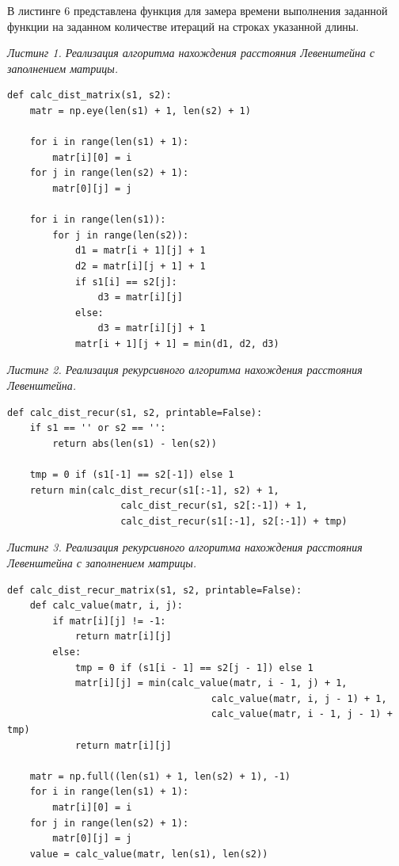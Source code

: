 \documentclass[a4paper,12pt]{article}
\begin{document}
В листинге 6 представлена функция для замера времени выполнения заданной функции на заданном количестве итераций на строках указанной длины.

\vspace{\baselineskip}

\noindent \textit{Листинг 1. Реализация алгоритма нахождения расстояния Левенштейна с заполнением матрицы.}

\begin{lstlisting}
def calc_dist_matrix(s1, s2):
	matr = np.eye(len(s1) + 1, len(s2) + 1)

	for i in range(len(s1) + 1):
		matr[i][0] = i
	for j in range(len(s2) + 1):
		matr[0][j] = j
	
	for i in range(len(s1)):
		for j in range(len(s2)):
			d1 = matr[i + 1][j] + 1
			d2 = matr[i][j + 1] + 1
			if s1[i] == s2[j]:
				d3 = matr[i][j]
			else:
				d3 = matr[i][j] + 1
			matr[i + 1][j + 1] = min(d1, d2, d3)
\end{lstlisting}

\noindent \textit{Листинг 2. Реализация рекурсивного алгоритма нахождения расстояния Левенштейна.}

\begin{lstlisting}
def calc_dist_recur(s1, s2, printable=False):
	if s1 == '' or s2 == '':
		return abs(len(s1) - len(s2))
	
	tmp = 0 if (s1[-1] == s2[-1]) else 1
	return min(calc_dist_recur(s1[:-1], s2) + 1,
					calc_dist_recur(s1, s2[:-1]) + 1,
					calc_dist_recur(s1[:-1], s2[:-1]) + tmp)
\end{lstlisting}

\clearpage

\noindent \textit{Листинг 3. Реализация рекурсивного алгоритма нахождения расстояния Левенштейна с заполнением матрицы.}

\begin{lstlisting}
def calc_dist_recur_matrix(s1, s2, printable=False):
	def calc_value(matr, i, j):
		if matr[i][j] != -1:
			return matr[i][j]
		else:
			tmp = 0 if (s1[i - 1] == s2[j - 1]) else 1
			matr[i][j] = min(calc_value(matr, i - 1, j) + 1,
									calc_value(matr, i, j - 1) + 1,
									calc_value(matr, i - 1, j - 1) + tmp)
			return matr[i][j]

	matr = np.full((len(s1) + 1, len(s2) + 1), -1)
	for i in range(len(s1) + 1):
		matr[i][0] = i
	for j in range(len(s2) + 1):
		matr[0][j] = j
	value = calc_value(matr, len(s1), len(s2))
\end{lstlisting}
\end{document}
